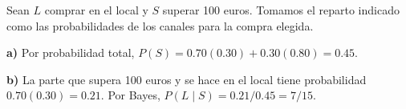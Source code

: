 Sean $L$ comprar en el local y $S$ superar 100 euros.
Tomamos el reparto indicado como las probabilidades de los canales
para la compra elegida.

\textbf{a)} Por probabilidad total,
$P(S)=0.70(0.30)+0.30(0.80)=\boxed{0.45}$.

\textbf{b)} La parte que supera 100 euros y se hace en el local
tiene probabilidad $0.70(0.30)=0.21$. Por Bayes,
$P(L\mid S)=0.21/0.45=\boxed{7/15}$.
